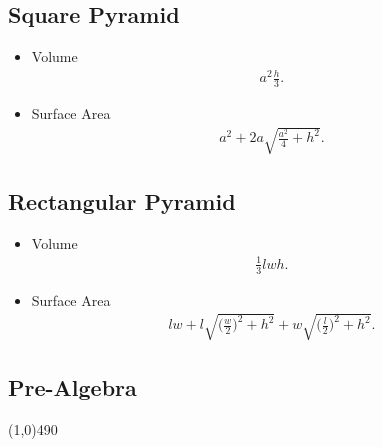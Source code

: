 \documentclass{report}
\begin{document}
    \bigbreak \noindent \bigbreak \noindent 
    \subsection{Square Pyramid}
    \begin{itemize}
      \item Volume
        \begin{align*}
          a^{2}\frac{h}{3}
        .\end{align*}
      \item Surface Area
        \begin{align*}
          a^{2}+2a \sqrt{\frac{a^{2}}{4}+h^{2}}
        .\end{align*}
    \end{itemize}

    \bigbreak \noindent \bigbreak \noindent 
    \subsection{Rectangular Pyramid}
    \begin{itemize}
      \item Volume
        \begin{align*}
          \frac{1}{3}lwh 
        .\end{align*}
      \item Surface Area
        \begin{align*}
          lw + l \sqrt{\bigg(\frac{w}{2}\bigg)^{2}+h^{2}} + w\sqrt{\bigg(\frac{l}{2}\bigg)^{2}+h^{2}}
        .\end{align*}
    \end{itemize}


    \pagebreak \bigbreak \noindent
    \begin{center}
      \section{\Large{Pre-Algebra}}
    \end{center}
    \line(1,0){490}
    \bigbreak \noindent \bigbreak \noindent 
\end{document}
